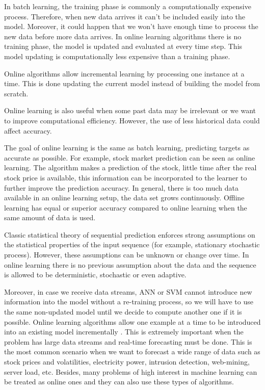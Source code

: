 In batch learning, the training phase is commonly a computationally expensive
process. Therefore, when new data arrives it can't be included easily into the
model. Moreover, it could happen that we won't have enough time to process the
new data before more data arrives. In online learning algorithms there is no
training phase, the model is updated and evaluated at every time step. This
model updating is computationally less expensive than a training phase.

Online algorithms allow incremental learning by processing one instance at a
time. This is done updating the current model instead of building the model from
scratch.

Online learning is also useful when some past data may be irrelevant
or we want to improve computational efficiency. However, the use of less
historical data could affect accuracy.

The goal of online learning is the same as batch learning, predicting targets as
accurate as possible. For example, stock market prediction can be seen as online
learning. The algorithm makes a prediction of the stock, little time after the
real stock price is available, this information can be incorporated to the
learner to further improve the prediction accuracy. In general, there is too
much data available in an online learning setup, the data set grows
continuously. Offline learning has equal or superior accuracy compared to online
learning when the same amount of data is used.

Classic statistical theory of sequential prediction enforces strong assumptions
on the statistical properties of the input sequence (for example, stationary
stochastic process). However, these assumptions can be unknown or change over
time. In online learning there is no previous assumption about the data and the
sequence is allowed to be deterministic, stochastic or even adaptive.  

Moreover, in case we receive data streams, ANN or SVM cannot introduce new
information into the model without a re-training process, so we will have to use
the same non-updated model until we decide to compute another one if it is
possible.  Online learning algorithms allow one example at a time to be
introduced into an existing model incrementally \cite{vovk2005}. This is
extremely important when the problem has large data streams and real-time
forecasting must be done.  This is the most common scenario when we want to
forecast a wide range of data such as stock prices and volatilities, electricity
power, intrusion detection, web-mining, server load, etc.  Besides, many
problems of high interest in machine learning can be treated as online ones and
they can also use these types of algorithms.

